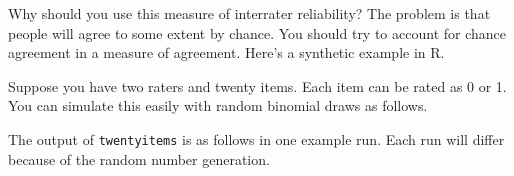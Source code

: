Why should you use this measure of interrater reliability? The problem
is that people will agree to some extent by chance. You should try to
account for chance agreement in a measure of agreement. Here's a
synthetic example in R.

Suppose you have two raters and twenty items. Each item can be rated as
0 or 1. You can simulate this easily with random binomial draws as
follows.

\begin{Shaded}
\begin{Highlighting}[]
\OtherTok{\textless{}{-}} 
\OtherTok{\textless{}{-}} 
\OtherTok{\textless{}{-}} \NormalTok{(} \NormalTok{, }
\OtherTok{\textless{}{-}} \NormalTok{(} \NormalTok{, }
\OtherTok{\textless{}{-}} 
\end{Highlighting}
\end{Shaded}

The output of \texttt{twentyitems} is as follows in one example run.
Each run will differ because of the random number generation.

